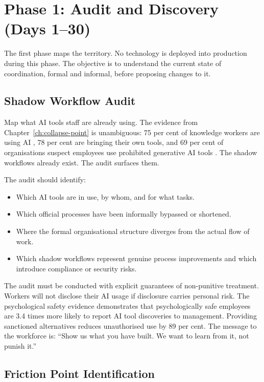 \section{Phase 1: Audit and Discovery (Days 1--30)}

The first phase maps the territory. No technology is deployed into production during this phase. The objective is to understand the current state of coordination, formal and informal, before proposing changes to it.

\subsection{Shadow Workflow Audit}

Map what AI tools staff are already using. The evidence from Chapter~\ref{ch:collapse-point} is unambiguous: 75 per cent of knowledge workers are using AI \parencite{MicrosoftWorkTrend2024}, 78 per cent are bringing their own tools, and 69 per cent of organisations suspect employees use prohibited generative AI tools \parencite{Gartner2025}. The shadow workflows already exist. The audit surfaces them.

The audit should identify:
\begin{itemize}
  \item Which AI tools are in use, by whom, and for what tasks.
  \item Which official processes have been informally bypassed or shortened.
  \item Where the formal organisational structure diverges from the actual flow of work.
  \item Which shadow workflows represent genuine process improvements and which introduce compliance or security risks.
\end{itemize}

The audit must be conducted with explicit guarantees of non-punitive treatment. Workers will not disclose their AI usage if disclosure carries personal risk. The psychological safety evidence \parencite{EdmondsonLei2025} demonstrates that psychologically safe employees are 3.4 times more likely to report AI tool discoveries to management. Providing sanctioned alternatives reduces unauthorised use by 89 per cent. The message to the workforce is: ``Show us what you have built. We want to learn from it, not punish it.''

\subsection{Friction Point Identification}

